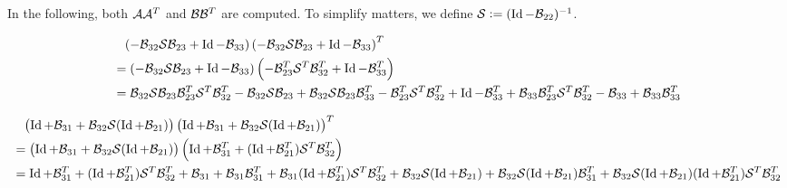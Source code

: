 \documentclass[]{scrartcl}
\numberwithin{equation}{section}
\begin{document}
\begin{landscape}
In the following, both $\A \A^T$ and $\B \B^T$ are computed. To simplify matters, we define $\S := (\Id - \B_{22})^{-1}$.

\begin{align*}
 &\hphantom{= } \left(-\B_{32} \S \B_{23} + \Id - \B_{33} \right) \left(-\B_{32} \S \B_{23} + \Id - \B_{33} \right)^T \\
 &= \left(-\B_{32} \S \B_{23} + \Id - \B_{33} \right) \left(-\B_{23}^T \S^T \B_{32}^T + \Id - \B_{33}^T \right) \\
 &= \B_{32} \S \B_{23} \B_{23}^T \S^T \B_{32}^T -\B_{32} \S \B_{23} + \B_{32} \S \B_{23} \B_{33}^T -\B_{23}^T \S^T \B_{32}^T + \Id - \B_{33}^T
 + \B_{33} \B_{23}^T \S^T \B_{32}^T - \B_{33} + \B_{33} \B_{33}^T
\end{align*}

\begin{align*}
 &\hphantom{=} \left(\Id + \B_{31} + \B_{32} \S(\Id + \B_{21}) \right) \left(\Id + \B_{31} + \B_{32} \S(\Id + \B_{21}) \right)^T \\
 &= \left(\Id + \B_{31} + \B_{32} \S(\Id + \B_{21}) \right)
 \left(\Id + \B_{31}^T + (\Id + \B_{21}^T) \S^T \B_{32}^T \right) \\
 &= \Id + \B_{31}^T + (\Id + \B_{21}^T) \S^T \B_{32}^T
 + \B_{31} + \B_{31} \B_{31}^T + \B_{31} (\Id + \B_{21}^T) \S^T \B_{32}^T
 + \B_{32} \S(\Id + \B_{21}) + \B_{32} \S(\Id + \B_{21}) \B_{31}^T + \B_{32} \S(\Id + \B_{21})(\Id + \B_{21}^T) \S^T \B_{32}^T
\end{align*}


\end{landscape}
\end{document}
